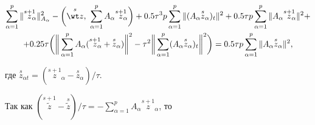 \begin{multline}


\sum\limits_{\alpha=1}^p \| \overset {s+1}{z}_{\!\!\!\alpha}\|_


{A_\alpha}^2


-\bigg( \overset {s}{\wt z},\ \sum\limits_{\alpha=1}^p 


A_ \alpha\overset {s+1}{z}_{\!\!\!\alpha}\bigg)+


0.5\tau^3 p\sum\limits_{\alpha=1}^p


\|(A_\alpha \overset {s}{z}_\alpha)_t\|^2


+0.5\tau p \sum\limits_{\alpha=1}^p \|


A_\alpha\overset {s+1}{z}_{\!\!\!\alpha}\|^2+ \\


%


+0.25\tau\bigg(\bigg\| \sum\limits_{\alpha=1}^p


A_\alpha(\overset {s+1}{z}_{\!\!\!\alpha}+


\overset {s}{z}_\alpha)\bigg\|^2 -


\tau^2 \bigg\|\sum\limits_{\alpha=1}^p (A_\alpha


\overset {s}{z}{}_\alpha)_t\bigg\|^2 \bigg)=


0.5\tau p \sum\limits_{\alpha=1}^p 


\|A_\alpha \overset {s}{z}{}_\alpha\|^2,


\end{multline}


где $\overset {s}{z}{}_{\alpha t}=(\overset {s+1}{z}_{\!\!\!\alpha}-


\overset {s}{z}{}_\alpha)/\tau$.


Так как $(\overset {s+1}{\widetilde z}-\overset {s}


{ \widetilde z})/\tau =- \sum\limits_{\alpha=1}^p  A_\alpha


\overset {s+1}{z}_{\!\!\!\alpha}$, то


